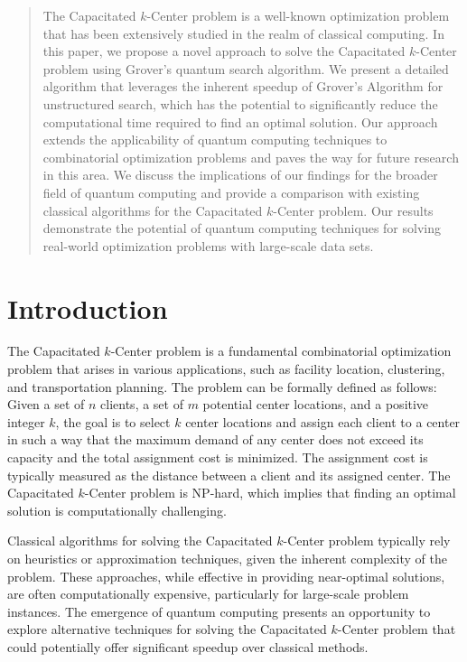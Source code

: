\begin{abstract}
The Capacitated $k$-Center problem is a well-known optimization problem that has been extensively studied in the realm of classical computing. In this paper, we propose a novel approach to solve the Capacitated $k$-Center problem using Grover's quantum search algorithm. We present a detailed algorithm that leverages the inherent speedup of Grover's Algorithm for unstructured search, which has the potential to significantly reduce the computational time required to find an optimal solution. Our approach extends the applicability of quantum computing techniques to combinatorial optimization problems and paves the way for future research in this area. We discuss the implications of our findings for the broader field of quantum computing and provide a comparison with existing classical algorithms for the Capacitated $k$-Center problem. Our results demonstrate the potential of quantum computing techniques for solving real-world optimization problems with large-scale data sets.
\end{abstract}

\section{Introduction}

The Capacitated $k$-Center problem is a fundamental combinatorial optimization problem that arises in various applications, such as facility location, clustering, and transportation planning. The problem can be formally defined as follows: Given a set of $n$ clients, a set of $m$ potential center locations, and a positive integer $k$, the goal is to select $k$ center locations and assign each client to a center in such a way that the maximum demand of any center does not exceed its capacity and the total assignment cost is minimized. The assignment cost is typically measured as the distance between a client and its assigned center. The Capacitated $k$-Center problem is NP-hard, which implies that finding an optimal solution is computationally challenging.

Classical algorithms for solving the Capacitated $k$-Center problem typically rely on heuristics or approximation techniques, given the inherent complexity of the problem. These approaches, while effective in providing near-optimal solutions, are often computationally expensive, particularly for large-scale problem instances. The emergence of quantum computing presents an opportunity to explore alternative techniques for solving the Capacitated $k$-Center problem that could potentially offer significant speedup over classical methods.

